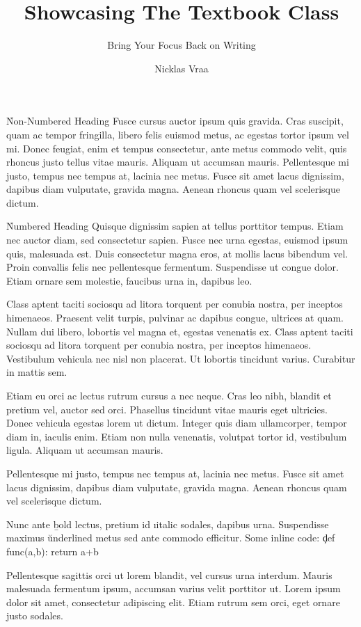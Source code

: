 \documentclass{textbook}
\title     {Showcasing The Textbook Class}
\subtitle  {Bring Your Focus Back on Writing}
\author    {Nicklas Vraa}
\begin{document}
\h*{Non-Numbered Heading}
Fusce cursus auctor ipsum quis gravida. Cras suscipit, quam ac tempor fringilla, libero felis euismod metus, ac egestas tortor ipsum vel mi. Donec feugiat, enim et tempus consectetur, ante metus commodo velit, quis rhoncus justo tellus vitae mauris. Aliquam ut accumsan mauris. Pellentesque mi justo, tempus nec tempus at, lacinia nec metus. Fusce sit amet lacus dignissim, dapibus diam vulputate, gravida magna. Aenean rhoncus quam vel scelerisque dictum.

\toc

\h{Numbered Heading}
Quisque dignissim sapien at tellus porttitor tempus. Etiam nec auctor diam, sed consectetur sapien. Fusce nec urna egestas, euismod ipsum quis, malesuada est. Duis consectetur magna eros, at mollis lacus bibendum vel. Proin convallis felis nec pellentesque fermentum. Suspendisse ut congue dolor. Etiam ornare sem molestie, faucibus urna in, dapibus leo.

Class aptent taciti sociosqu ad litora torquent per conubia nostra, per inceptos himenaeos. Praesent velit turpis, pulvinar ac dapibus congue, ultrices at quam. Nullam dui libero, lobortis vel magna et, egestas venenatis ex. Class aptent taciti sociosqu ad litora torquent per conubia nostra, per inceptos himenaeos. Vestibulum vehicula nec nisl non placerat. Ut lobortis tincidunt varius. Curabitur in mattis sem.

Etiam eu orci ac lectus rutrum cursus a nec neque. Cras leo nibh, blandit et pretium vel, auctor sed orci. Phasellus tincidunt vitae mauris eget ultricies. Donec vehicula egestas lorem ut dictum. Integer quis diam ullamcorper, tempor diam in, iaculis enim. Etiam non nulla venenatis, volutpat tortor id, vestibulum ligula. Aliquam ut accumsan mauris.

Pellentesque mi justo, tempus nec tempus at, lacinia nec metus. Fusce sit amet lacus dignissim, dapibus diam vulputate, gravida magna. Aenean rhoncus quam vel scelerisque dictum.

Nunc ante \b{bold} lectus, pretium id \i{italic} sodales, dapibus  urna. Suspendisse maximus \u{underlined} metus sed ante commodo efficitur. Some inline code: \c{def func(a,b): return a+b}

Pellentesque sagittis orci ut lorem blandit, vel cursus urna interdum. Mauris malesuada fermentum ipsum, accumsan varius velit porttitor ut. Lorem ipsum dolor sit amet, consectetur adipiscing elit. Etiam rutrum sem orci, eget ornare justo sodales.
\end{document}
